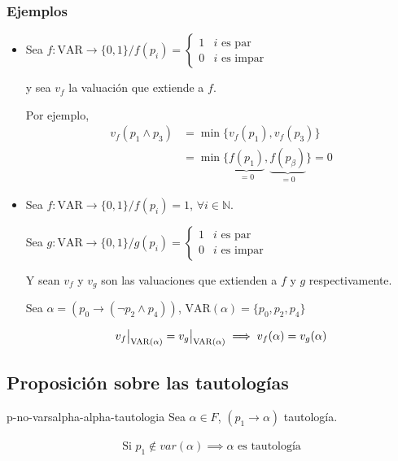 \subsubsection{Ejemplos}

\begin{itemize}
    \item Sea $f: \mathrm{VAR} \to \{ 0,1 \} / f(p_i) =
        \begin{cases}
            1 & i \text{ es par} \\
            0 & i \text{ es impar}
        \end{cases}$

    y sea $v_f$ la valuación que extiende a $f$.


    Por ejemplo,
    \begin{align*}
        v_f(p_1 \wedge p_3) &= \min{\{ v_f(p_1), v_f(p_3)\}} \\
                            &= \min{\{ \underbrace{f(p_1)}_{=0},
                            \underbrace{f(p_\beta)}_{=0} \}} = 0
    \end{align*}


    \item Sea $f:\mathrm{VAR} \to \{ 0,1 \} / f(p_i) = 1$, $\forall i \in \mathbb{N}$. 
 
    Sea $g: \mathrm{VAR} \to \{ 0,1 \} / g(p_i) =
        \begin{cases}
            1 & i \text{ es par} \\
            0 & i \text{ es impar}
        \end{cases}$
 
    Y sean $v_f$ y $v_g$ son las valuaciones que extienden a $f$ 
    y $g$ respectivamente.
 
    Sea $\alpha = (p_0 \to (\neg p_2 \wedge p_4))$, 
    $\mathrm{VAR}(\alpha) = \{ p_0,p_2,p_4 \}$

    \begin{gather*}
        \frest{v_f}{\mathrm{VAR}(\alpha)} = \frest{v_g}{\mathrm{VAR}(\alpha)} 
        \implies v_f(\alpha) = v_g(\alpha)
    \end{gather*}
\end{itemize}


\subsection{Proposición sobre las tautologías}


%
\begin{proposicion}{}{p-no-varsalpha-alpha-tautologia}
    Sea $\alpha \in F$, $(p_1 \to \alpha)$ tautología.

    \medskip

   \begin{gather*}
       \text{Si } p_1 \notin var(\alpha) 
        \implies \alpha \text{ es tautología}
   \end{gather*} 
\end{proposicion}

